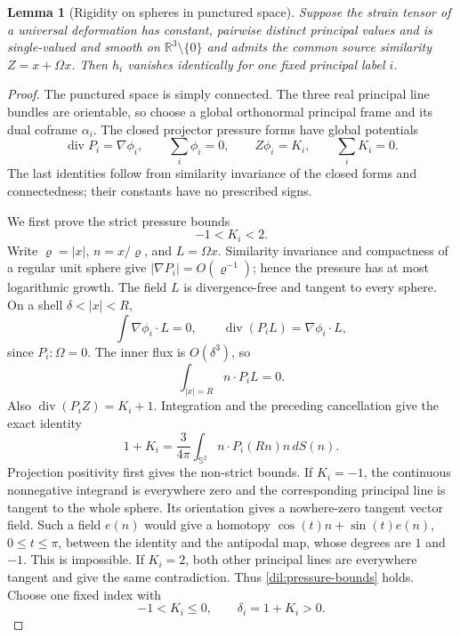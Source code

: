 \documentclass[11pt,a4paper]{article}
\numberwithin{equation}{section}
\theoremstyle{plain}
\newtheorem{lemma}[theorem]{Lemma}
\theoremstyle{definition}
\theoremstyle{remark}
\begin{document}
\begin{lemma}[Rigidity on spheres in punctured space]\label{dil:regular-sphere}
Suppose the strain tensor of a universal deformation has constant, pairwise distinct
principal values and is single-valued
and smooth on $\mathbb R^3\setminus\{0\}$ and admits the common source
similarity $Z=x+\Omega x$.  Then $h_i$ vanishes identically for one fixed principal label $i$.
\end{lemma}
\begin{proof}
The punctured space is simply connected.  The three real principal
line bundles are orientable, so choose a global orthonormal
principal frame and its dual coframe $\alpha_i$.  The closed
projector pressure forms have global potentials
\begin{equation}\label{dil:global-pressure}
          \operatorname{div}P_i=\nabla\phi_i,\qquad
          \sum_i\phi_i=0,\qquad Z\phi_i=K_i,\qquad\sum_iK_i=0.
\end{equation}
The last identities follow from similarity invariance of the closed
forms and connectedness; their constants have no prescribed signs.

We first prove the strict pressure bounds
\begin{equation}\label{dil:pressure-bounds}
                              -1<K_i<2.
\end{equation}
Write $\varrho=|x|$, $n=x/\varrho$, and $L=\Omega x$.
Similarity invariance and compactness of a regular unit sphere give
$|\nabla P_i|=O(\varrho^{-1})$; hence the pressure has at most
logarithmic growth.  The field $L$ is divergence-free and tangent to
every sphere.  On a shell $\delta<|x|<R$,
\[
 \int\nabla\phi_i\cdot L=0,\qquad
 \operatorname{div}(P_iL)=\nabla\phi_i\cdot L,
\]
since $P_i:\Omega=0$.  The inner flux is $O(\delta^3)$, so
\[
                  \int_{|x|=R} n\cdot P_iL=0.
\]
Also $\operatorname{div}(P_iZ)=K_i+1$.  Integration and the preceding
cancellation give the exact identity
\begin{equation}\label{dil:sphere-pressure-average}
        1+K_i=\frac{3}{4\pi}\int_{\mathbb S^2}
                         n\cdot P_i(Rn)n\,dS(n).
\end{equation}
Projection positivity first gives the non-strict bounds.
If $K_i=-1$, the continuous nonnegative integrand is everywhere zero
and the corresponding principal line is tangent to the whole sphere.
Its orientation gives a nowhere-zero tangent vector field.  Such a
field $e(n)$ would give a homotopy
$\cos(t)n+\sin(t)e(n)$, $0\le t\le\pi$, between the identity and the
antipodal map, whose degrees are $1$ and $-1$.  This is impossible.
If $K_i=2$, both other principal lines are everywhere tangent and
give the same contradiction.  Thus \eqref{dil:pressure-bounds}
holds.  Choose one fixed index with
\begin{equation}\label{dil:chosen-pressure}
                       -1<K_i\le0,\qquad \delta_i=1+K_i>0.
\end{equation}


\end{proof}
\end{document}
